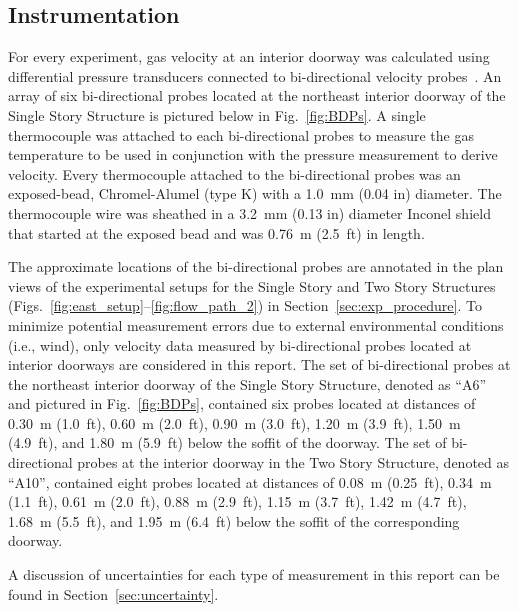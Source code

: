 \documentclass[12pt,oneside]{book}
\begin{document}
\subsection{Instrumentation}
\label{sec:instrumentation}
For every experiment, gas velocity at an interior doorway was calculated using differential pressure transducers connected to bi-directional velocity probes~\cite{McCaffrey:Combustion_and_Flame}. An array of six bi-directional probes located at the northeast interior doorway of the Single Story Structure is pictured below in Fig.~\ref{fig:BDPs}. A single thermocouple was attached to each bi-directional probes to measure the gas temperature to be used in conjunction with the pressure measurement to derive velocity. Every thermocouple attached to the bi-directional probes was an exposed-bead, Chromel-Alumel (type K) with a 1.0~mm (0.04 in) diameter. The thermocouple wire was sheathed in a 3.2~mm (0.13 in) diameter Inconel shield that started at the exposed bead and was 0.76~m (2.5~ft) in length. 

The approximate locations of the bi-directional probes are annotated in the plan views of the experimental setups for the Single Story and Two Story Structures (Figs.~\ref{fig:east_setup}--\ref{fig:flow_path_2}) in Section~\ref{sec:exp_procedure}. To minimize potential measurement errors due to external environmental conditions (i.e., wind), only velocity data measured by bi-directional probes located at interior doorways are considered in this report. The set of bi-directional probes at the northeast interior doorway of the Single Story Structure, denoted as ``A6'' and pictured in Fig.~\ref{fig:BDPs}, contained six probes located at distances of 0.30~m (1.0~ft), 0.60~m (2.0~ft), 0.90~m (3.0~ft), 1.20~m (3.9~ft), 1.50~m (4.9~ft), and 1.80~m (5.9~ft) below the soffit of the doorway. The set of bi-directional probes at the interior doorway in the Two Story Structure, denoted as ``A10'', contained eight probes located at distances of 0.08~m (0.25~ft), 0.34~m (1.1~ft), 0.61~m (2.0~ft), 0.88~m (2.9~ft), 1.15~m (3.7~ft), 1.42~m (4.7~ft), 1.68~m (5.5~ft), and 1.95~m (6.4~ft) below the soffit of the corresponding doorway.

A discussion of uncertainties for each type of measurement in this report can be found in Section~\ref{sec:uncertainty}.
\end{document}
